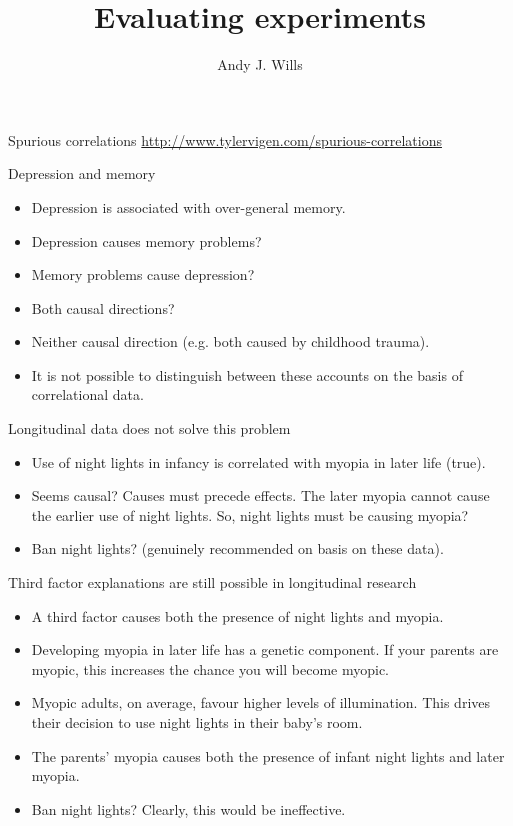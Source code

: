 \documentclass{beamer}
\title[Critical Thinking]{Evaluating experiments}
\author{Andy J. Wills}
\date{}
\begin{document}
\frame{\titlepage}

\begin{frame}{Spurious correlations}
	\url{http://www.tylervigen.com/spurious-correlations}
\end{frame}

\begin{frame}{Depression and memory}
\begin{itemize}
\item Depression is associated with over-general memory.
\vspace{12 pt}
\item Depression causes memory problems? 
\item Memory problems cause depression?
\item Both causal directions?
\item Neither causal direction (e.g. both caused by childhood trauma). 
\vspace{12 pt}
\item It is not possible to distinguish between these accounts on the basis of correlational data.
\end{itemize}
\end{frame}

\begin{frame}{Longitudinal data does not solve this problem}
\begin{itemize}
\item Use of night lights in infancy is correlated with myopia in later life (true).
\vspace{12 pt}
\item Seems causal? Causes must precede effects. The later myopia cannot cause the earlier use of night lights.
So, night lights must be causing myopia?

\item Ban night lights? (genuinely recommended on basis on these data).
\end{itemize}
\end{frame}

\begin{frame}{Third factor explanations are still possible in longitudinal research}
\begin{itemize}
\item A third factor causes both the presence of night lights and myopia.
\item Developing myopia in later life has a genetic component. If your parents are myopic, this increases the chance you will become myopic.
\item Myopic adults, on average, favour higher levels of illumination. This drives their decision to use night lights in their baby's room. 
\item The parents' myopia causes both the presence of infant night lights and later myopia.
\item Ban night lights? Clearly, this would be ineffective.
\end{itemize}
\end{frame}
\end{document}
